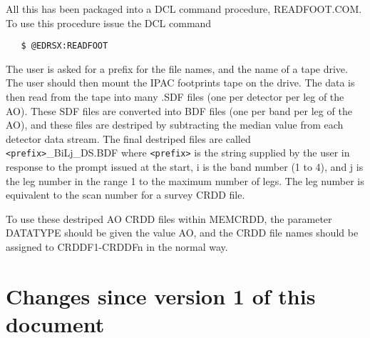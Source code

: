 All this has been packaged into a DCL command procedure, READFOOT.COM. To
use this procedure issue the DCL command

\begin{verbatim}
   $ @EDRSX:READFOOT
\end{verbatim}

The user is asked for a prefix for the file names, and the name of a tape
drive. The user should then mount the IPAC footprints tape on the drive. The
data is then read from the tape into many .SDF files (one per detector per leg
of the AO). These SDF files are converted into BDF files (one per band per leg
of the AO), and these files are destriped by subtracting the median value from
each detector data stream. The final destriped files are called
\verb+<prefix>+\_BiLj\_DS.BDF  where \verb+<prefix>+ is the string supplied by
the user in response to the prompt issued at the start, i is the band number (1
to 4), and j is the leg number in the range 1 to the maximum number of legs.
The leg number is equivalent to the scan number for a survey CRDD file. 

To use these destriped AO CRDD files within MEMCRDD, the parameter DATATYPE
should be given the value AO, and the CRDD file names should be assigned
to CRDDF1-CRDDFn in the normal way.

\section{Changes since version 1 of this document}


